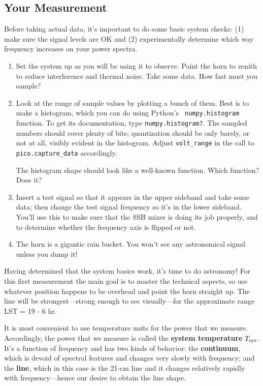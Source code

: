 \documentclass[11pt,preprint]{aastex}
\begin{document}
\subsection{Your Measurement}

Before taking actual data, it's important to do some basic system
checks: (1) make sure the signal levels are OK and (2) experimentally
determine which way frequency increases on your power spectra.
\begin{enumerate}

\item Set the system up as you will be using it to observe. Point the
  horn to zenith to reduce interference and thermal noise.  Take some
data.  How fast must you sample? 

\item Look at the range of sample values by plotting a bunch of
  them. Best is to make a histogram, which you can do using Python's {\tt
    numpy.histogram} function.  
      To get its documentation,
    type {\tt numpy.histogram?}.
    The sampled numbers should cover plenty of bits;
  quantization should be only barely, or not at all, visibly evident in
  the histogram. Adjust {\tt volt\_range} in the call to {\tt pico.capture\_data}
  accordingly.

The
  histogram shape should look like a well-known function. Which
  function? Does it?

\item Insert a test signal so that it appears in the upper sideband and
take some data; then change the test signal frequency so it's in the
lower sideband.  You'll use this to make sure that the SSB mixer is
doing its job properly, and to determine whether the frequency axis
is flipped or not.

\item The horn is a gigantic rain bucket. You won't see any
  astronomical signal unless you dump it!

\end{enumerate}

Having determined that the system basics work, it's time to do
astronomy! For this first measurement the main goal is to master the
technical aspects, so use whatever position happens to be overhead and
point the horn straight up. The line will be strongest---strong enough
to see visually---for the approximate range LST = 19 - 6 hr.

It is most convenient to use temperature units for the power
that we measure. Accordingly, the power that we measure is called the
{\bf system temperature} $T_{\rm sys}$. It's a function of frequency and has two
kinds of behavior: the {\bf continuum}, which is devoid of spectral features
and changes very slowly with frequency; and the {\bf line}, which in this
case is the 21-cm line and it changes relatively rapidly with frequency---hence our
desire to obtain the line shape.
\end{document}
